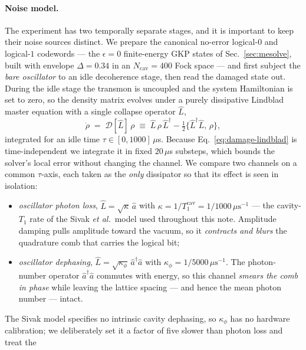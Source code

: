 \documentclass[11pt]{article}
\begin{document}
\paragraph{Noise model.} The experiment has two temporally separate stages, and it is important
to keep their noise sources distinct. We prepare the canonical no-error logical-$0$ and
logical-$1$ codewords --- the $\epsilon=0$ finite-energy GKP states of Sec.~\ref{sec:mesolve},
built with envelope $\Delta=0.34$ in an $N_{\mathrm{cav}}=400$ Fock space --- and first
subject the \emph{bare oscillator} to an idle decoherence stage, then read the damaged state
out. During the idle stage the transmon is uncoupled and the system Hamiltonian is set to
zero, so the density matrix evolves under a purely dissipative Lindblad master equation with a
single collapse operator $\hat L$,
\begin{equation}
\dot\rho \;=\; \mathcal{D}[\hat L]\,\rho
  \;\equiv\; \hat L\,\rho\,\hat L^{\dagger} - \tfrac12\bigl\{\hat L^{\dagger}\hat L,\,\rho\bigr\},
\label{eq:damage-lindblad}
\end{equation}
integrated for an idle time $\tau\in[0,1000]\,\mu$s. Because Eq.~\eqref{eq:damage-lindblad} is
time-independent we integrate it in fixed $20\,\mu$s substeps, which bounds the solver's local
error without changing the channel. We compare two channels on a common $\tau$-axis, each taken
as the \emph{only} dissipator so that its effect is seen in isolation:
\begin{itemize}
  \item \emph{oscillator photon loss}, $\hat L=\sqrt{\kappa}\,\hat a$ with
        $\kappa = 1/T_1^{\mathrm{cav}} = 1/1000\,\mu\mathrm{s}^{-1}$ --- the cavity-$T_1$ rate of
        the Sivak \emph{et al.}\ model used throughout this note. Amplitude damping pulls
        amplitude toward the vacuum, so it \emph{contracts and blurs} the quadrature comb that
        carries the logical bit;
  \item \emph{oscillator dephasing}, $\hat L=\sqrt{\kappa_\phi}\,\hat a^{\dagger}\hat a$ with
        $\kappa_\phi = 1/5000\,\mu\mathrm{s}^{-1}$. The photon-number operator $\hat a^\dagger\hat a$
        commutes with energy, so this channel \emph{smears the comb in phase} while leaving the
        lattice spacing --- and hence the mean photon number --- intact.
\end{itemize}
The Sivak model specifies no intrinsic cavity dephasing, so $\kappa_\phi$ has no hardware
calibration; we deliberately set it a factor of five slower than photon loss and treat the
\end{document}
